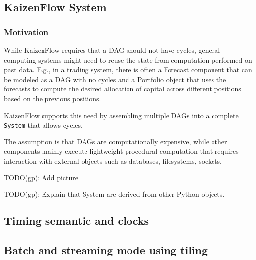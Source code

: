 \documentclass[11pt, reqno]{amsart}
\theoremstyle{definition}
\theoremstyle{remark}
\begin{document}

  \subsection{KaizenFlow System}

  \subsubsection{Motivation}

  While KaizenFlow requires that a DAG should not have cycles, general computing systems
  might need to reuse the state from computation performed on past data. E.g.,
  in a trading system, there is often a Forecast component that can be modeled as
  a DAG with no cycles and a Portfolio object that uses the forecasts to compute
  the desired allocation of capital across different positions based on the previous
  positions.

  KaizenFlow supports this need by assembling multiple DAGs into a complete \verb|System|
  that allows cycles.

  The assumption is that DAGs are computationally expensive, while other
  components mainly execute lightweight procedural computation that requires
  interaction with external objects such as databases, filesystems, sockets.

  TODO(gp): Add picture

  TODO(gp): Explain that System are derived from other Python objects.

  \subsection{Timing semantic and clocks}

  \subsection{Batch and streaming mode using tiling}
\end{document}

